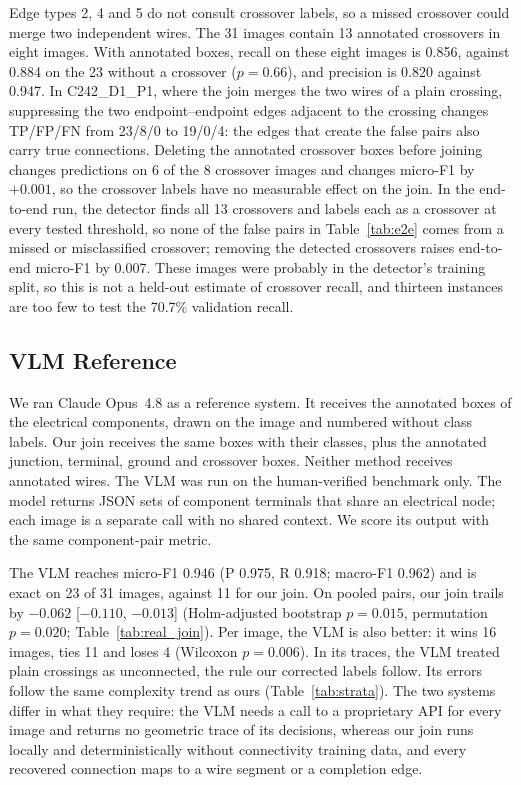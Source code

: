 \documentclass[journal]{IEEEtran}
\begin{document}
Edge types 2, 4 and 5 do not consult crossover labels, so a missed crossover could merge two independent wires. The 31 images contain 13 annotated crossovers in eight images. With annotated boxes, recall on these eight images is 0.856, against 0.884 on the 23 without a crossover ($p=0.66$), and precision is 0.820 against 0.947. In C242\_D1\_P1, where the join merges the two wires of a plain crossing, suppressing the two endpoint--endpoint edges adjacent to the crossing changes TP/FP/FN from 23/8/0 to 19/0/4: the edges that create the false pairs also carry true connections. Deleting the annotated crossover boxes before joining changes predictions on 6 of the 8 crossover images and changes micro-F1 by $+0.001$, so the crossover labels have no measurable effect on the join. In the end-to-end run, the detector finds all 13 crossovers and labels each as a crossover at every tested threshold, so none of the false pairs in Table~\ref{tab:e2e} comes from a missed or misclassified crossover; removing the detected crossovers raises end-to-end micro-F1 by 0.007. These images were probably in the detector's training split, so this is not a held-out estimate of crossover recall, and thirteen instances are too few to test the 70.7\% validation recall.

\subsection{VLM Reference}
\label{sec:vlm_results}

We ran Claude Opus~4.8 as a reference system. It receives the annotated boxes of the electrical components, drawn on the image and numbered without class labels. Our join receives the same boxes with their classes, plus the annotated junction, terminal, ground and crossover boxes. Neither method receives annotated wires. The VLM was run on the human-verified benchmark only. The model returns JSON sets of component terminals that share an electrical node; each image is a separate call with no shared context. We score its output with the same component-pair metric.

The VLM reaches micro-F1 0.946 (P 0.975, R 0.918; macro-F1 0.962) and is exact on 23 of 31 images, against 11 for our join. On pooled pairs, our join trails by $-0.062$ [$-0.110$, $-0.013$] (Holm-adjusted bootstrap $p=0.015$, permutation $p=0.020$; Table~\ref{tab:real_join}). Per image, the VLM is also better: it wins 16 images, ties 11 and loses 4 (Wilcoxon $p=0.006$). In its traces, the VLM treated plain crossings as unconnected, the rule our corrected labels follow. Its errors follow the same complexity trend as ours (Table~\ref{tab:strata}). The two systems differ in what they require: the VLM needs a call to a proprietary API for every image and returns no geometric trace of its decisions, whereas our join runs locally and deterministically without connectivity training data, and every recovered connection maps to a wire segment or a completion edge.
\end{document}
